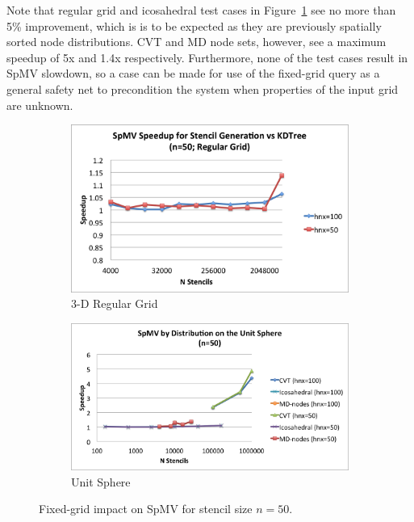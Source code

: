 \documentclass{report}
\begin{document}
Note that regular grid and icosahedral test cases in Figure~\ref{fig:spmv_impact_rg} see no more than 5\% improvement, which is is to be expected as they are previously spatially sorted node distributions. CVT and MD node sets, however, see a maximum speedup of 5x and 1.4x respectively. Furthermore, none of the test cases result in SpMV slowdown, so a case can be made for use of the fixed-grid query as a general safety net to precondition the system when properties of the input grid are unknown. 

\begin{figure}
\centering
\begin{subfigure}{9.5cm}
\includegraphics[width=\textwidth]{../figures/stencils/reg_subsets_4m_spmv_speedup.png}
\caption{3-D Regular Grid}
\end{subfigure}
\begin{subfigure}{10.5cm}
\includegraphics[width=\textwidth]{../figures/stencils/sphere_spmv_speedup.png} 
\caption{Unit Sphere}
\end{subfigure}
\caption{Fixed-grid impact on SpMV for stencil size $n=50$.}
\label{fig:spmv_impact_rg}
\end{figure}
\end{document}
